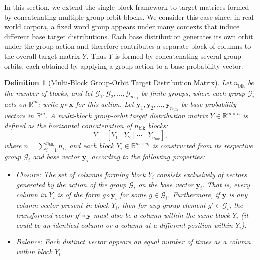 \documentclass[11pt]{article}
\newtheorem{definition}{Definition}
\begin{document}
In this section, we extend the single-block framework to target matrices formed by concatenating multiple group-orbit blocks. We consider this case since, in real-world corpora, a fixed word group appears under many contexts that induce different base target distributions. Each base distribution generates its own orbit under the group action and therefore contributes a separate block of columns to the overall target matrix \(Y\). Thus \(Y\) is formed by concatenating several group orbits, each obtained by applying a group action to a base probability vector.

\begin{definition}[Multi-Block Group-Orbit Target Distribution Matrix]
\label{def:multi_block_group_orbit_Y}
Let \(n_{\mathrm{blk}}\) be the number of blocks, and let \(\mathcal G_1, \mathcal G_2, \ldots, \mathcal G_{n_{\mathrm{blk}}}\) be finite groups, where each group \(\mathcal G_i\) acts on \(\mathbb{R}^m\); write \(g\circ \boldsymbol{x}\) for this action.
Let \(\boldsymbol{y}_1, \boldsymbol{y}_2, \ldots, \boldsymbol{y}_{n_{\mathrm{blk}}}\) be base probability vectors in \(\mathbb{R}^m\).
A multi-block group-orbit target distribution matrix \(Y \in \mathbb{R}^{m \times n}\) is defined as the horizontal concatenation of \(n_{\mathrm{blk}}\) blocks:
\[
Y = [Y_1 \mid Y_2 \mid \cdots \mid Y_{n_{\mathrm{blk}}}],
\]
where \(n = \sum_{i=1}^{n_{\mathrm{blk}}} n_i\), and each block \(Y_i \in \mathbb{R}^{m \times n_i}\) is constructed from its respective group \(\mathcal G_i\) and base vector \(\boldsymbol{y}_i\) according to the following properties:
\begin{itemize}
    \item Closure: The set of columns forming block \(Y_i\) consists exclusively of vectors generated by the action of the group \(\mathcal G_i\) on the base vector \(\boldsymbol{y}_i\). That is, every column in \(Y_i\) is of the form \(g\circ \boldsymbol{y}_i\) for some \(g \in \mathcal G_i\). Furthermore, if \(\boldsymbol{y}\) is any column vector present in block \(Y_i\), then for any group element \(g' \in \mathcal G_i\), the transformed vector \(g'\circ \boldsymbol{y}\) must also be a column within the same block \(Y_i\) (it could be an identical column or a column at a different position within \(Y_i\)).
    \item Balance: Each distinct vector appears an equal number of times as a column within block \(Y_i\).
\end{itemize}
\end{definition}
\end{document}
